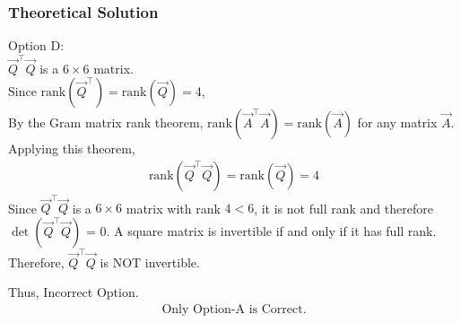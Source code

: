 \documentclass{beamer}
\begin{document}
\begin{frame}[fragile]
    \frametitle{Theoretical Solution}
Option D:\\
$\vec{Q}^\top\vec{Q}$ is a $6 \times 6$ matrix.\\
Since $\text{rank}(\vec{Q}^\top) = \text{rank}(\vec{Q}) = 4$,\\
By the Gram matrix rank theorem, $\text{rank}(\vec{A}^\top\vec{A}) = \text{rank}(\vec{A})$ for any matrix $\vec{A}$.\\
Applying this theorem,
\begin{align}
\text{rank}(\vec{Q}^\top\vec{Q}) = \text{rank}(\vec{Q}) = 4
\end{align}
Since $\vec{Q}^\top\vec{Q}$ is a $6 \times 6$ matrix with rank $4 < 6$, it is not full rank and therefore $\det{(\vec{Q}^\top\vec{Q})}$ = 0. A square matrix is invertible if and only if it has full rank. Therefore, $\vec{Q}^\top\vec{Q}$ is NOT invertible.

Thus, Incorrect Option.\\

\begin{align*}
    \boxed{\text{Only Option-A is Correct.}}
\end{align*}
\end{frame}
\end{document}
